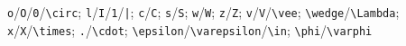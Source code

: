 \texttt{o}/\texttt{O}/\texttt{0}/\texttt{\textbackslash{}circ}; \texttt{l}/\texttt{I}/\texttt{1}/\texttt{|}; \texttt{c}/\texttt{C}; \texttt{s}/\texttt{S}; \texttt{w}/\texttt{W}; \texttt{z}/\texttt{Z}; \texttt{v}/\texttt{V}/\texttt{\textbackslash{}vee}; \texttt{\textbackslash{}wedge}/\texttt{\textbackslash{}Lambda}; \texttt{x}/\texttt{X}/\texttt{\textbackslash{}times}; \texttt{.}/\texttt{\textbackslash{}cdot}; \texttt{\textbackslash{}epsilon}/\texttt{\textbackslash{}varepsilon}/\texttt{\textbackslash{}in}; \texttt{\textbackslash{}phi}/\texttt{\textbackslash{}varphi}
